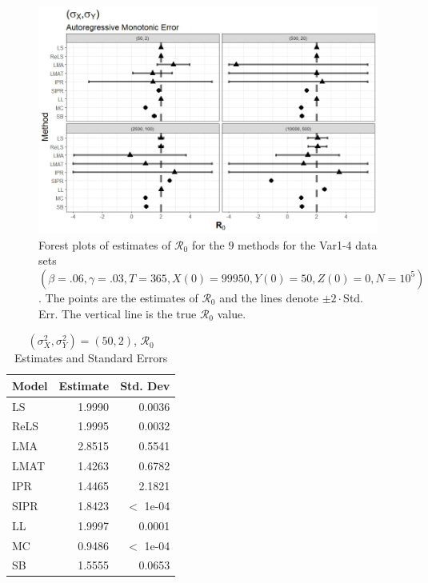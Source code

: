 \documentclass[12pt]{article}
\newcommand{\xxsir}{\ensuremath{9} } %
\newcommand{\rr}{\ensuremath{\mathcal{R}_0}}
\begin{document}
\begin{figure}[H]
	\begin{center}
		\includegraphics[scale=0.5]{images/var_arm.jpeg}
		\caption{Forest plots of estimates of $\rr$ for the \xxsir methods for the Var1-4 data sets $(\beta=.06, \gamma=.03, T=365, X(0)=99950, Y(0)=50, Z(0)=0, N=10^5)$.  The points are the estimates of $\rr$ and the lines denote $\pm 2\cdot $Std. Err.  The vertical line is the true $\rr$ value.}
	\end{center}
\end{figure}

\begin{table}[H]
	
	
	\centering
	\begin{tabular}[t]{l|r|r}
		\hline
		Model & Estimate & Std. Dev\\
		\hline
		LS & 1.9990 & 0.0036\\
		\hline
		ReLS & 1.9995 & 0.0032\\
		\hline
		LMA & 2.8515 & 0.5541\\
		\hline
		LMAT & 1.4263 & 0.6782\\
		\hline
		IPR & 1.4465 & 2.1821\\
		\hline
		SIPR & 1.8423 & $<$ 1e-04\\
		\hline
		LL & 1.9997 & 0.0001\\
		\hline
		MC & 0.9486 & $<$ 1e-04\\
		\hline
		SB & 1.5555 & 0.0653\\
		\hline
	\end{tabular}
	\caption{ $(\sigma^2_X, \sigma^2_Y) = (50, 2)$, $\rr$ Estimates and Standard Errors}
\end{table}
\end{document}
